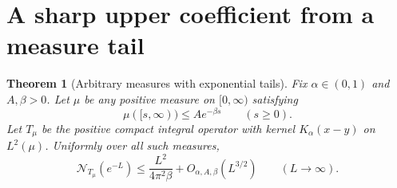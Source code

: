 \documentclass[11pt]{article}
\newtheorem{theorem}{Theorem}[section]
\newcommand{\N}{\mathcal N}
\begin{document}
\section{A sharp upper coefficient from a measure tail}\label{sec:tail}
\begin{theorem}[Arbitrary measures with exponential tails]\label{thm:measure}
Fix $\alpha\in(0,1)$ and $A,\beta>0$. Let $\mu$ be any positive
measure on $[0,\infty)$ satisfying
\begin{equation}\label{eq:tail}
                      \mu([s,\infty))\le A e^{-\beta s}
                      \qquad(s\ge0).
\end{equation}
Let $T_\mu$ be the positive compact integral operator with kernel
$K_\alpha(x-y)$ on $L^2(\mu)$. Uniformly over all such measures,
\begin{equation}\label{eq:generaltailbound}
 \N_{T_\mu}(e^{-L})
 \le \frac{L^2}{4\pi^2\beta}+O_{\alpha,A,\beta}(L^{3/2})
 \qquad(L\longrightarrow\infty).
\end{equation}
\end{theorem}
\end{document}
